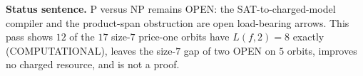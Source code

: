 \documentclass[11pt]{article}
\begin{document}
\bigskip
\noindent\textbf{Status sentence.} P versus NP remains OPEN: the SAT-to-charged-model compiler and the product-span obstruction are open load-bearing arrows. This pass shows $12$ of the $17$ size-$7$ price-one orbits have $L(f,2)=8$ exactly (COMPUTATIONAL), leaves the size-$7$ gap of two OPEN on $5$ orbits, improves no charged resource, and is not a proof.
\end{document}
